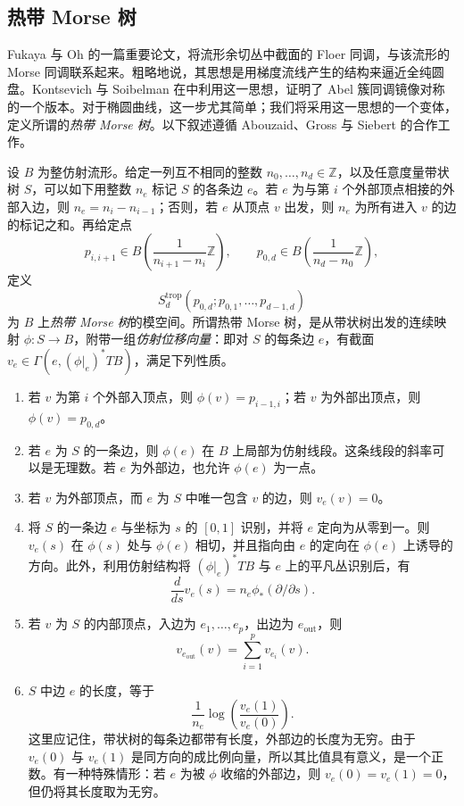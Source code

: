 \subsection{热带 Morse 树}\label{sec:8.4.3}

Fukaya 与 Oh 的一篇重要论文，将流形余切丛中截面的 Floer 同调，与该流形的 Morse 同调联系起来。粗略地说，其思想是用梯度流线产生的结构来逼近全纯圆盘。Kontsevich 与 Soibelman 在中利用这一思想，证明了 Abel 簇同调镜像对称的一个版本。对于椭圆曲线，这一步尤其简单；我们将采用这一思想的一个变体，定义所谓的\emph{热带 Morse 树}。以下叙述遵循 Abouzaid、Gross 与 Siebert 的合作工作。

\begin{definition}\label{def:8.19}
设 $B$ 为整仿射流形。给定一列互不相同的整数 $n_0,\ldots,n_d\in\mathbb Z$，以及任意度量带状树 $S$，可以如下用整数 $n_e$ 标记 $S$ 的各条边 $e$。若 $e$ 为与第 $i$ 个外部顶点相接的外部入边，则 $n_e=n_i-n_{i-1}$；否则，若 $e$ 从顶点 $v$ 出发，则 $n_e$ 为所有进入 $v$ 的边的标记之和。再给定点
\[
p_{i,i+1}\in B\left(\frac1{n_{i+1}-n_i}\mathbb Z\right),
\qquad
p_{0,d}\in B\left(\frac1{n_d-n_0}\mathbb Z\right),
\]
定义
\[
S_d^{\mathrm{trop}}(p_{0,d};p_{0,1},\ldots,p_{d-1,d})
\]
为 $B$ 上\emph{热带 Morse 树}的模空间。所谓热带 Morse 树，是从带状树出发的连续映射 $\phi\colon S\to B$，附带一组\emph{仿射位移向量}：即对 $S$ 的每条边 $e$，有截面 $v_e\in\Gamma(e,(\phi|_e)^*TB)$，满足下列性质。
\begin{enumerate}
\item 若 $v$ 为第 $i$ 个外部入顶点，则 $\phi(v)=p_{i-1,i}$；若 $v$ 为外部出顶点，则 $\phi(v)=p_{0,d}$。
\item 若 $e$ 为 $S$ 的一条边，则 $\phi(e)$ 在 $B$ 上局部为仿射线段。这条线段的斜率可以是无理数。若 $e$ 为外部边，也允许 $\phi(e)$ 为一点。
\item 若 $v$ 为外部顶点，而 $e$ 为 $S$ 中唯一包含 $v$ 的边，则 $v_e(v)=0$。
\item 将 $S$ 的一条边 $e$ 与坐标为 $s$ 的 $[0,1]$ 识别，并将 $e$ 定向为从零到一。则 $v_e(s)$ 在 $\phi(s)$ 处与 $\phi(e)$ 相切，并且指向由 $e$ 的定向在 $\phi(e)$ 上诱导的方向。此外，利用仿射结构将 $(\phi|_e)^*TB$ 与 $e$ 上的平凡丛识别后，有
\[
\frac{d}{ds}v_e(s)=n_e\phi_*(\partial/\partial s).
\]
\item 若 $v$ 为 $S$ 的内部顶点，入边为 $e_1,\ldots,e_p$，出边为 $e_{\mathrm{out}}$，则
\[
v_{e_{\mathrm{out}}}(v)=\sum_{i=1}^p v_{e_i}(v).
\]
\item $S$ 中边 $e$ 的长度，等于
\[
\frac1{n_e}\log\left(\frac{v_e(1)}{v_e(0)}\right).
\]
这里应记住，带状树的每条边都带有长度，外部边的长度为无穷。由于 $v_e(0)$ 与 $v_e(1)$ 是同方向的成比例向量，所以其比值具有意义，是一个正数。有一种特殊情形：若 $e$ 为被 $\phi$ 收缩的外部边，则 $v_e(0)=v_e(1)=0$，但仍将其长度取为无穷。
\end{enumerate}
\end{definition}

